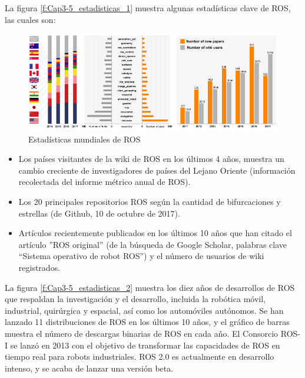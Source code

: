         La figura \eqref{f:Cap3-5_estadisticas_1} muestra algunas estadísticas clave de ROS, las cuales son:

            \begin{figure}[htb]
                \centering
                \includegraphics[width=1.0\linewidth]{Main/Chapter3/Images3/science_robot_esta_1.png}
                \caption{Estadísticas mundiales de ROS \cite{Zhangeaar1868}}
                \label{f:Cap3-5_estadisticas_1}
            \end{figure}        

        \begin{itemize}
            \item {Los países visitantes de la wiki de ROS en los últimos 4 años, muestra un cambio creciente de investigadores de países del Lejano Oriente (información recolectada del informe métrico anual de ROS). }
            \item {Los 20 principales repositorios ROS según la cantidad de bifurcaciones y estrellas (de Github, 10 de octubre de 2017).}
            \item {Artículos recientemente publicados en los últimos 10 años que han citado el artículo ''ROS original'' (de la búsqueda de Google Scholar, palabras clave “Sistema operativo de robot ROS”) y el número de usuarios de wiki registrados.}
        \end{itemize}
        

        La figura \eqref{f:Cap3-5_estadisticas_2} muestra los diez años de desarrollos de ROS que respaldan la investigación y el desarrollo, incluida la robótica móvil, industrial, quirúrgica y espacial, así como los automóviles autónomos. Se han lanzado 11 distribuciones de ROS en los últimos 10 años, y el gráfico de barras muestra el número de descargas binarias de ROS en cada año. El Consorcio ROS-I se lanzó en 2013 con el objetivo de transformar las capacidades de ROS en tiempo real para robots industriales. ROS 2.0 es actualmente en desarrollo intenso, y se acaba de lanzar una versión beta.


